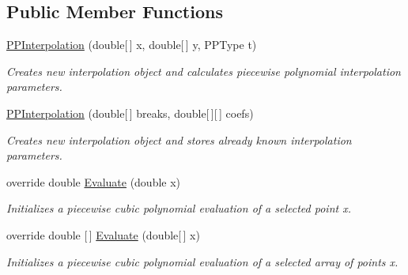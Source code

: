\subsection*{Public Member Functions}
\begin{DoxyCompactItemize}
\item 
\hyperlink{class_isotope_fit_1_1_p_p_interpolation_afaeb635a338f06714d3b12e3865ac4f2}{P\+P\+Interpolation} (double\mbox{[}$\,$\mbox{]} x, double\mbox{[}$\,$\mbox{]} y, P\+P\+Type t)
\begin{DoxyCompactList}\small\item\em Creates new interpolation object and calculates piecewise polynomial interpolation parameters. \end{DoxyCompactList}\item 
\hyperlink{class_isotope_fit_1_1_p_p_interpolation_a22298333495a707643412a540e461188}{P\+P\+Interpolation} (double\mbox{[}$\,$\mbox{]} breaks, double\mbox{[}$\,$\mbox{]}\mbox{[}$\,$\mbox{]} coefs)
\begin{DoxyCompactList}\small\item\em Creates new interpolation object and stores already known interpolation parameters. \end{DoxyCompactList}\item 
override double \hyperlink{class_isotope_fit_1_1_p_p_interpolation_a1849081f6f187cb948c7f8f7dba866af}{Evaluate} (double x)
\begin{DoxyCompactList}\small\item\em Initializes a piecewise cubic polynomial evaluation of a selected point x. \end{DoxyCompactList}\item 
override double \mbox{[}$\,$\mbox{]} \hyperlink{class_isotope_fit_1_1_p_p_interpolation_a5a4a1dbfcaa78e520dfc965e64ed227c}{Evaluate} (double\mbox{[}$\,$\mbox{]} x)
\begin{DoxyCompactList}\small\item\em Initializes a piecewise cubic polynomial evaluation of a selected array of points x. \end{DoxyCompactList}\end{DoxyCompactItemize}

